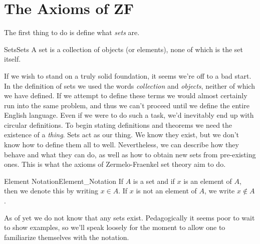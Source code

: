\section{The Axioms of ZF}
    The first thing to do is define what \textit{sets} are.
    \begin{fdefinition}{Sets}{Sets}
        A \gls{set} is a collection of objects (or elements), none of which is
        the set itself.
    \end{fdefinition}
    If we wish to stand on a truly solid foundation, it seems we're off to a bad
    start. In the definition of sets we used the words \textit{collection} and
    \textit{objects}, neither of which we have defined. If we attempt to define
    these terms we would almost certainly run into the same problem, and thus we
    can't proceed until we define the entire English language. Even if we were
    to do such a task, we'd inevitably end up with circular definitions. To
    begin stating definitions and theorems we need the existence of a
    \textit{thing}. Sets act as our thing. We know they exist, but we don't know
    how to define them all to well. Nevertheless, we can describe how they
    behave and what they can do, as well as how to obtain new sets from
    pre-existing ones. This is what the axioms of Zermelo-Fraenkel set theory
    aim to do.
    \begin{fnotation}{Element Notation}{Element_Notation}
        If $A$ is a \gls{set} and if $x$ is an element of $A$, then we denote
        this by writing $x\in{A}$. If $x$ is not an element of $A$, we write
        $x\notin{A}$.
    \end{fnotation}
    As of yet we do not know that any sets exist. Pedagogically it seems poor to
    wait to show examples, so we'll speak loosely for the moment to allow one to
    familiarize themselves with the notation.
